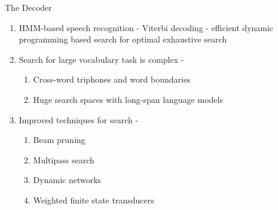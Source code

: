 \begin{frame}{The Decoder}
\begin{enumerate}
\item HMM-based speech recognition - \alert{Viterbi decoding} - efficient dynamic programming based 
search for optimal exhaustive search
\item Search for large vocabulary task is \alert{complex} -
\begin{enumerate}
\item Cross-word triphones and word boundaries
\item Huge search spaces with long-span language models
\end{enumerate}
\item Improved techniques for search \cite{saon2005anatomy,allauzen2004generalized,rybach2013lexical}-
\begin{enumerate}
\item Beam pruning
\item Multipass search
\item Dynamic networks
\item Weighted finite state transducers
\end{enumerate}
\end{enumerate}
\end{frame}

